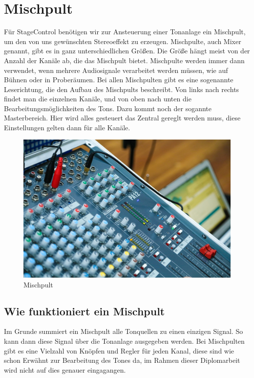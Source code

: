 \section{Mischpult}
 Für StageControl benötigen wir zur Ansteuerung einer Tonanlage ein Mischpult, um den von uns gewünschten Stereoeffekt zu erzeugen. Mischpulte, auch Mixer genannt, gibt es in ganz unterschiedlichen Größen. Die Größe hängt meist von der Anzahl der Kanäle ab, die das Mischpult bietet. Mischpulte werden immer dann verwendet, wenn mehrere Audiosignale verarbeitet werden müssen, wie auf Bühnen oder in Proberäumen. Bei allen Mischpulten gibt es eine sogenannte Leserichtung, die den Aufbau des Mischpults beschreibt. Von links nach rechts findet man die einzelnen Kanäle, und von oben nach unten die Bearbeitungsmöglichkeiten des Tons. Dazu kommt noch der sogannte Masterbereich. Hier wird alles gesteuert das Zentral gereglt werden muss, diese Einstellungen gelten dann für alle Kanäle. \\
\cite{Mischpult_Information}  \cite{Mischpult_Master}

\begin{figure}[H]
	\centering
	\includegraphics[width=0.8\linewidth]{images/mischpult.jpg}
	\caption[Mischpult]{Mischpult}
	\label{fig:Mischpult}
\end{figure}

\subsection{Wie funktioniert ein Mischpult}
Im Grunde summiert ein Mischpult alle Tonquellen zu einen einzigen Signal. So kann dann diese Signal über die Tonanlage ausgegeben werden. Bei Mischpulten gibt es eine Vielzahl von Knöpfen und Regler für jeden Kanal, diese sind wie schon Erwähnt zur Bearbeitung des Tones da, im Rahmen dieser Diplomarbeit wird nicht auf dies genauer eingagangen. \\
\cite{Mischpult_Erklaerung}

